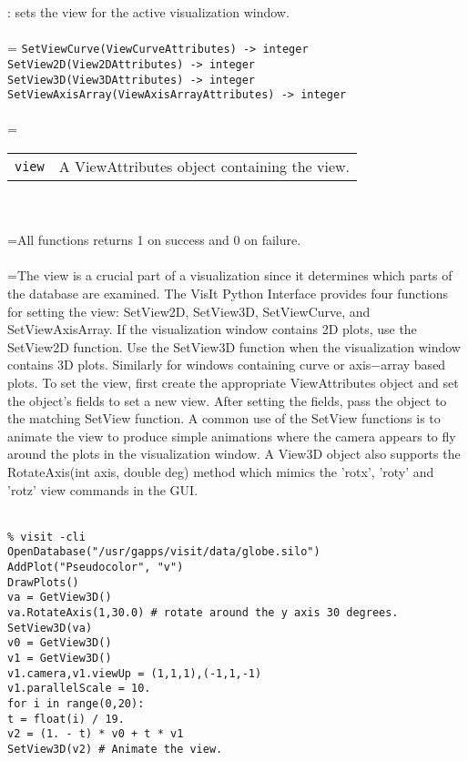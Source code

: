 \documentclass[10pt,a4paper]{report}
\begin{document}
{}
: sets the view for the active visualization window.\\[-3mm]

 \\ 
\hangindent=\parindent 
\verb!SetViewCurve(ViewCurveAttributes) -> integer!\\ 
\verb!SetView2D(View2DAttributes) -> integer!\\ 
\verb!SetView3D(View3DAttributes) -> integer!\\ 
\verb!SetViewAxisArray(ViewAxisArrayAttributes) -> integer!\\ [-3mm]

 \\ 
\hangindent=\parindent 
\begin{tabular}{lp{9cm}}
\verb!view! & A ViewAttributes object containing the view. \\
\end{tabular} \\[-2mm]


 \\ 
\hangindent=\parindent All functions returns 1 on success and 0 on failure. \\[-3mm] 

 \\ 
\hangindent=\parindent The view is a crucial part of a visualization since it determines which parts of the database are examined. The VisIt Python Interface provides four functions for setting the view: SetView2D, SetView3D, SetViewCurve, and SetViewAxisArray. If the visualization window contains 2D plots, use the SetView2D function. Use the SetView3D function when the visualization window contains 3D plots.  Similarly for windows containing curve or axis$-$array based plots.  To set the view, first create the appropriate ViewAttributes object and set the object's fields to set a new view. After setting the fields, pass the object to the matching SetView function. A common use of the SetView functions is to animate the view to produce simple animations where the camera appears to fly around the plots in the visualization window. A View3D object also supports the RotateAxis(int axis, double deg) method which mimics the 'rotx', 'roty' and 'rotz' view commands in the GUI. \\[-3mm] 

\\[-6mm]
\begin{verbatim}% visit -cli
OpenDatabase("/usr/gapps/visit/data/globe.silo")
AddPlot("Pseudocolor", "v")
DrawPlots()
va = GetView3D()
va.RotateAxis(1,30.0) # rotate around the y axis 30 degrees.
SetView3D(va)
v0 = GetView3D()
v1 = GetView3D()
v1.camera,v1.viewUp = (1,1,1),(-1,1,-1)
v1.parallelScale = 10.
for i in range(0,20):
t = float(i) / 19.
v2 = (1. - t) * v0 + t * v1
SetView3D(v2) # Animate the view.
\end{verbatim}
\newpage
\end{document}
